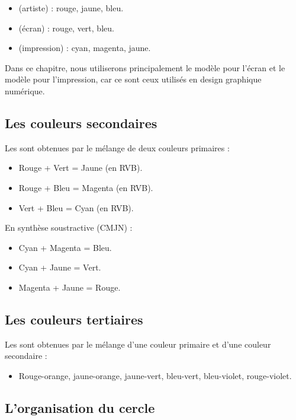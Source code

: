 \begin{itemize}
    \item {} (artiste) : rouge, jaune, bleu.
    \item {} (écran) : rouge, vert, bleu.
    \item {} (impression) : cyan, magenta, jaune.
\end{itemize}

Dans ce chapitre, nous utiliserons principalement le modèle  pour l'écran et le modèle  pour l'impression, car ce sont ceux utilisés en design graphique numérique.

\subsection{Les couleurs secondaires}

Les  sont obtenues par le mélange de deux couleurs primaires :

\begin{itemize}
    \item Rouge + Vert = Jaune (en RVB).
    \item Rouge + Bleu = Magenta (en RVB).
    \item Vert + Bleu = Cyan (en RVB).
\end{itemize}

En synthèse soustractive (CMJN) :

\begin{itemize}
    \item Cyan + Magenta = Bleu.
    \item Cyan + Jaune = Vert.
    \item Magenta + Jaune = Rouge.
\end{itemize}

\subsection{Les couleurs tertiaires}

Les  sont obtenues par le mélange d'une couleur primaire et d'une couleur secondaire :

\begin{itemize}
    \item Rouge-orange, jaune-orange, jaune-vert, bleu-vert, bleu-violet, rouge-violet.
\end{itemize}

\subsection{L'organisation du cercle}

